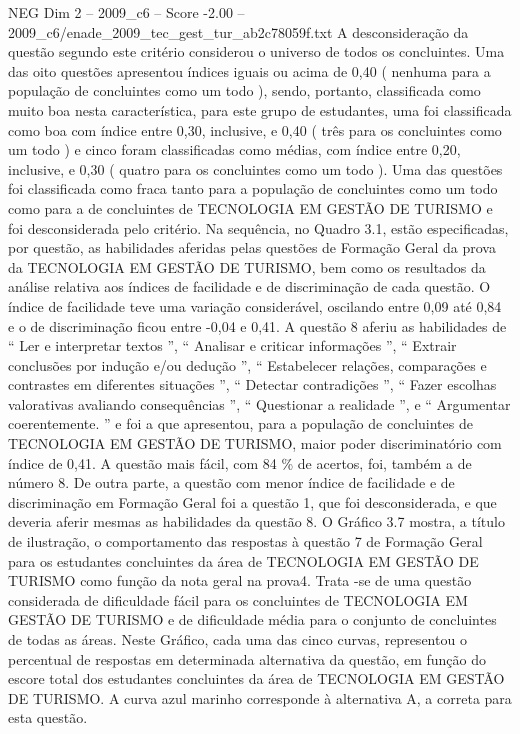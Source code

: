 \begin{textsample}{NEG Dim 2 – 2009\_c6 – Score -2.00 – 2009\_c6/enade\_2009\_tec\_gest\_tur\_ab2c78059f.txt}
A desconsideração da questão segundo este critério considerou o universo de todos os concluintes.
Uma das oito questões apresentou índices iguais ou acima de 0,40 ( nenhuma para a população de concluintes como um todo ), sendo, portanto, classificada como muito boa nesta característica, para este grupo de estudantes, uma foi classificada como boa com índice entre 0,30, inclusive, e 0,40 ( três para os concluintes como um todo ) e cinco foram classificadas como médias, com índice entre 0,20, inclusive, e 0,30 ( quatro para os concluintes como um todo ).
Uma das questões foi classificada como fraca tanto para a população de concluintes como um todo como para a de concluintes de TECNOLOGIA EM GESTÃO DE TURISMO e foi desconsiderada pelo critério.
Na sequência, no Quadro 3.1, estão especificadas, por questão, as habilidades aferidas pelas questões de Formação Geral da prova da TECNOLOGIA EM GESTÃO DE TURISMO, bem como os resultados da análise relativa aos índices de facilidade e de discriminação de cada questão.
O índice de facilidade teve uma variação considerável, oscilando entre 0,09 até 0,84 e o de discriminação ficou entre -0,04 e 0,41.
A questão 8 aferiu as habilidades de “ Ler e interpretar textos ”, “ Analisar e criticar informações ”, “ Extrair conclusões por indução e/ou dedução ”, “ Estabelecer relações, comparações e contrastes em diferentes situações ”, “ Detectar contradições ”, “ Fazer escolhas valorativas avaliando consequências ”, “ Questionar a realidade ”, e “ Argumentar coerentemente. ” e foi a que apresentou, para a população de concluintes de TECNOLOGIA EM GESTÃO DE TURISMO, maior poder discriminatório com índice de 0,41.
A questão mais fácil, com 84 \% de acertos, foi, também a de número 8.
De outra parte, a questão com menor índice de facilidade e de discriminação em Formação Geral foi a questão 1, que foi desconsiderada, e que deveria aferir mesmas as habilidades da questão 8.
O Gráfico 3.7 mostra, a título de ilustração, o comportamento das respostas à questão 7 de Formação Geral para os estudantes concluintes da área de TECNOLOGIA EM GESTÃO DE TURISMO como função da nota geral na prova4.
Trata -se de uma questão considerada de dificuldade fácil para os concluintes de TECNOLOGIA EM GESTÃO DE TURISMO e de dificuldade média para o conjunto de concluintes de todas as áreas.
Neste Gráfico, cada uma das cinco curvas, representou o percentual de respostas em determinada alternativa da questão, em função do escore total dos estudantes concluintes da área de TECNOLOGIA EM GESTÃO DE TURISMO.
A curva azul marinho corresponde à alternativa A, a correta para esta questão.

\end{textsample}
